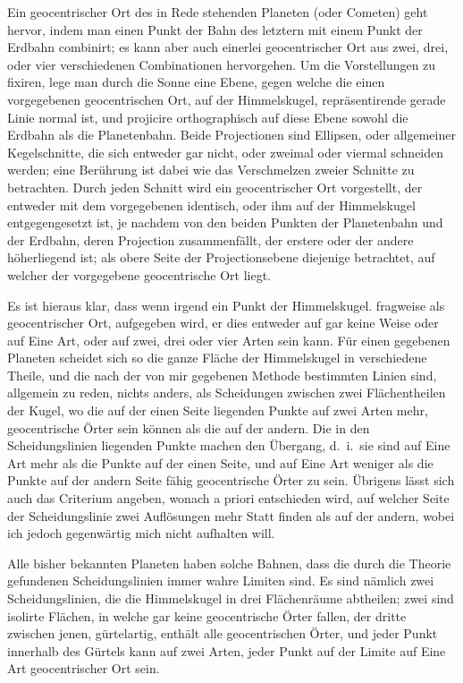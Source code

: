 Ein geocentrischer Ort des in Rede stehenden Planeten (oder Cometen) geht hervor, indem man einen Punkt der Bahn des letztern mit einem Punkt der Erdbahn combinirt; es kann aber auch einerlei geocentrischer Ort aus zwei, drei, oder vier verschiedenen Combinationen hervorgehen. Um die Vorstellungen zu fixiren, lege man durch die Sonne eine Ebene, gegen welche die einen vorgegebenen geocentrischen Ort, auf der Himmelskugel, repräsentirende gerade Linie normal ist, und projicire orthographisch auf diese Ebene sowohl die Erdbahn als die Planetenbahn. Beide Projectionen sind Ellipsen, oder allgemeiner Kegelschnitte, die sich entweder gar nicht, oder zweimal oder viermal schneiden werden; eine Berührung ist dabei wie das Verschmelzen zweier Schnitte zu betrachten. Durch jeden Schnitt wird ein geocentrischer Ort vorgestellt, der entweder mit dem vorgegebenen identisch, oder ihm auf der Himmelskugel entgegengesetzt ist, je nachdem von den beiden Punkten der Planetenbahn und der Erdbahn, deren Projection zusammenfällt, der erstere oder der andere höherliegend ist; als obere Seite der Projectionsebene diejenige betrachtet, auf welcher der vorgegebene geocentrische Ort liegt.

Es ist hieraus klar, dass wenn irgend ein Punkt der Himmelskugel. fragweise als geocentrischer Ort, aufgegeben wird, er dies entweder auf gar keine Weise oder auf Eine Art, oder auf zwei, drei oder vier Arten sein kann. Für einen gegebenen Planeten scheidet sich so die ganze Fläche der Himmelskugel in verschiedene Theile, und die nach der von mir gegebenen Methode bestimmten Linien sind, allgemein zu reden, nichts anders, als Scheidungen zwischen zwei Flächentheilen der Kugel, wo die auf der einen Seite liegenden Punkte auf zwei Arten mehr, geocentrische Örter sein können als die auf der andern. Die in den Scheidungslinien liegenden Punkte machen den Übergang, d.\ i.\ sie sind auf Eine Art mehr als die Punkte auf der einen Seite, und auf Eine Art weniger als die
%
Punkte auf der andern Seite fähig geocentrische Örter zu sein. Übrigens lässt sich auch das Criterium angeben, wonach a priori entschieden wird, auf welcher Seite der Scheidungslinie zwei Auflösungen mehr Statt finden als auf der andern, wobei ich jedoch gegenwärtig mich nicht aufhalten will.

Alle bisher bekannten Planeten haben solche Bahnen, dass die durch die Theorie gefundenen Scheidungslinien immer wahre Limiten sind. Es sind nämlich zwei Scheidungslinien, die die Himmelskugel in drei Flächenräume abtheilen; zwei sind isolirte Flächen, in welche gar keine geocentrische Örter fallen, der dritte zwischen jenen, gürtelartig, enthält alle geocentrischen Örter, und jeder Punkt innerhalb des Gürtels kann auf zwei Arten, jeder Punkt auf der Limite auf Eine Art geocentrischer Ort sein.

